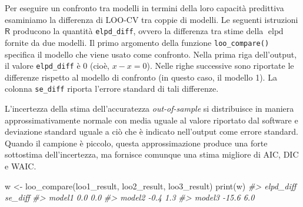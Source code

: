 \documentclass[
  10pt,
  italian,
  a4paper,
  extrafontsizes,onecolumn,openright
  ]{memoir}
\newenvironment{Shaded}{\begin{snugshade}}{\end{snugshade}}
\newcommand{\AttributeTok}[1]{\textcolor[rgb]{0.77,0.63,0.00}{#1}}
\newcommand{\CommentTok}[1]{\textcolor[rgb]{0.56,0.35,0.01}{\textit{#1}}}
\newcommand{\DecValTok}[1]{\textcolor[rgb]{0.00,0.00,0.81}{#1}}
\newcommand{\FunctionTok}[1]{\textcolor[rgb]{0.00,0.00,0.00}{#1}}
\newcommand{\NormalTok}[1]{#1}
\newcommand{\OtherTok}[1]{\textcolor[rgb]{0.56,0.35,0.01}{#1}}
\newcommand{\SpecialCharTok}[1]{\textcolor[rgb]{0.00,0.00,0.00}{#1}}
\DeclareMathOperator{\elpd}{elpd} %
\newcommand{\R}{\textsf{R}} %
\theoremstyle{definition}
\theoremstyle{definition}
\theoremstyle{definition}
\theoremstyle{definition}
\theoremstyle{remark}
\begin{document}
\begin{Shaded}
\end{Shaded}

Per eseguire un confronto tra modelli in termini della loro capacità predittiva esaminiamo la differenza di LOO-CV tra coppie di modelli. Le seguenti istruzioni \(\R\) producono la quantità \texttt{elpd\_diff}, ovvero la differenza tra stime della \(\elpd\) fornite da due modelli. Il primo argomento della funzione \texttt{loo\_compare()} specifica il modello che viene usato come confronto. Nella prima riga dell'output, il valore \texttt{elpd\_diff} è 0 (cioè, \(x − x = 0\)). Nelle righe successive sono riportate le differenze rispetto al modello di confronto (in questo caso, il modello 1). La colonna \texttt{se\_diff} riporta l'errore standard di tali differenze.

L'incertezza della stima dell'accuratezza \emph{out-of-sample} si distribuisce in maniera approssimativamente normale con media uguale al valore riportato dal software e deviazione standard uguale a ciò che è indicato nell'output come errore standard. Quando il campione è piccolo, questa approssimazione produce una forte sottostima dell'incertezza, ma fornisce comunque una stima migliore di AIC, DIC e WAIC.

\begin{Shaded}
\begin{Highlighting}[]
\NormalTok{w }\OtherTok{\textless{}{-}} \FunctionTok{loo\_compare}\NormalTok{(loo1\_result, loo2\_result, loo3\_result)}
\FunctionTok{print}\NormalTok{(w)}
\CommentTok{\#\textgreater{}        elpd\_diff se\_diff}
\CommentTok{\#\textgreater{} model1   0.0       0.0  }
\CommentTok{\#\textgreater{} model2  {-}0.4       1.3  }
\CommentTok{\#\textgreater{} model3 {-}15.6       6.0}
\end{Highlighting}
\end{Shaded}
\end{document}
